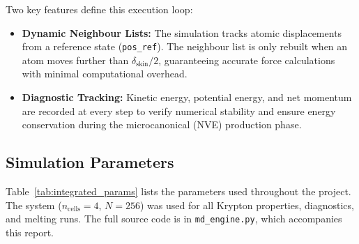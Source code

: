 Two key features define this execution loop:
\begin{itemize}
    \item \textbf{Dynamic Neighbour Lists:} The simulation tracks atomic displacements from a reference state (\texttt{pos\_ref}). The neighbour list is only rebuilt when an atom moves further than $\delta_\text{skin}/2$, guaranteeing accurate force calculations with minimal computational overhead.
    \item \textbf{Diagnostic Tracking:} Kinetic energy, potential energy, and net momentum are recorded at every step to verify numerical stability and ensure energy conservation during the microcanonical (NVE) production phase.
\end{itemize} 
\newpage

\subsection{Simulation Parameters}

Table~\ref{tab:integrated_params} lists the parameters used throughout the project. The system ($n_\text{cells} = 4$, $N = 256$) was used for all Krypton properties, diagnostics, and melting runs. The full source code is in \texttt{md\_engine.py}, which accompanies this report.

